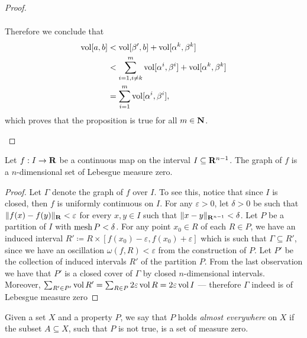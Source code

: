 \begin{proof}
\begin{enumerate}[(a)]
\begin{align*}
              \end{align*}
              Therefore we conclude that
              \begin{align*}
                  \operatorname{vol} [a, b]
                   & < \operatorname{vol} [\beta', b] + \operatorname{vol} [\alpha^k, \beta^k]                           \\
                   & < \sum_{i=1, i \neq k}^{m} \operatorname{vol} [\alpha^i, \beta^{i}] + \operatorname{vol} [\alpha^k,
                  \beta^k]                                                                   \\
                   & = \sum_{i=1}^m \operatorname{vol} [\alpha^i, \beta^i],
              \end{align*}
              which proves that the proposition is true for all \(m \in \mathbf{N}\).
    \end{enumerate}
\end{proof}

\begin{example}
    \label{exp:graph-lebesgue-measure-zero}
    Let \(f: I \to \mathbf{R}\) be a continuous map on the interval \(I \subseteq
    \mathbf{R}^{n-1}\). The graph of \(f\) is a \(n\)-dimensional set of Lebesgue measure
    zero.

    \begin{proof}
        Let \(\Gamma\) denote the graph of \(f\) over \(I\). To see this, notice that
        since \(I\) is closed, then \(f\) is uniformly continuous on \(I\). For any
        \(\varepsilon > 0\), let \(\delta > 0\) be such that \(\lVert f(x) - f(y)\rVert_{\mathbf{R}} <
        \varepsilon\) for every \(x, y \in I\) such that \(\lVert x - y\rVert_{\mathbf{R}^{n-1}} <
        \delta\). Let \(P\) be a partition of \(I\) with \(\operatorname{mesh} P < \delta\). For any
        point \(x_0 \in R\) of each \(R \in P\), we have an induced interval \(R'
        \coloneq R \times [f(x_0) - \varepsilon, f(x_0) + \varepsilon]\) which is such
        that \(\Gamma \subseteq R'\), since we have an oscillation \(\omega(f, R) <
        \varepsilon\) from the construction of \(P\). Let \(P'\) be the collection of
        induced intervals \(R'\) of the partition \(P\). From the last observation we
        have that \(P'\) is a closed cover of \(\Gamma\) by closed \(n\)-dimensional
        intervals. Moreover, \(\sum_{R' \in P'} \operatorname{vol} R' = \sum_{R \in P} 2 \varepsilon
        \operatorname{vol} R = 2 \varepsilon \operatorname{vol} I\) --- therefore \(\Gamma\) indeed is of Lebesgue
        measure zero
    \end{proof}
\end{example}

\begin{notation}
    Given a set \(X\) and a property \(P\), we say that \(P\) holds \emph{almost
        everywhere} on \(X\) if the subset \(A \subseteq X\), such that \(P\) is not
    true, is a set of measure zero.
\end{notation}

